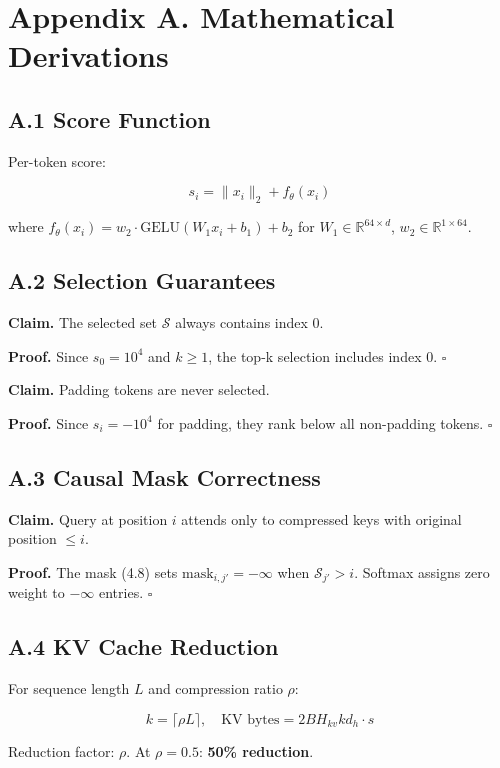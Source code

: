\section{Appendix A. Mathematical Derivations}

\subsection{A.1 Score Function}

Per-token score:

\[
s_i = \|x_i\|_2 + f_\theta(x_i)
\tag{A.1}
\]

where $f_\theta(x_i) = w_2 \cdot \text{GELU}(W_1 x_i + b_1) + b_2$ for 
$W_1 \in \mathbb{R}^{64 \times d}$, $w_2 \in \mathbb{R}^{1 \times 64}$.

\subsection{A.2 Selection Guarantees}

\textbf{Claim.} The selected set $\mathcal{S}$ always contains index 0.

\textbf{Proof.} Since $s_0 = 10^4$ and $k \geq 1$, the top-k selection 
includes index 0. $\square$

\textbf{Claim.} Padding tokens are never selected.

\textbf{Proof.} Since $s_i = -10^4$ for padding, they rank below all non-padding 
tokens. $\square$

\subsection{A.3 Causal Mask Correctness}

\textbf{Claim.} Query at position $i$ attends only to compressed keys with 
original position $\leq i$.

\textbf{Proof.} The mask (4.8) sets $\text{mask}_{i,j'} = -\infty$ when 
$\mathcal{S}_{j'} > i$. Softmax assigns zero weight to $-\infty$ entries. 
$\square$

\subsection{A.4 KV Cache Reduction}

For sequence length $L$ and compression ratio $\rho$:

\[
k = \lceil \rho L \rceil, \quad \text{KV bytes} = 2 B H_{kv} k d_h \cdot s
\tag{A.2}
\]

Reduction factor: $\rho$. At $\rho = 0.5$: \textbf{50\% reduction}.

